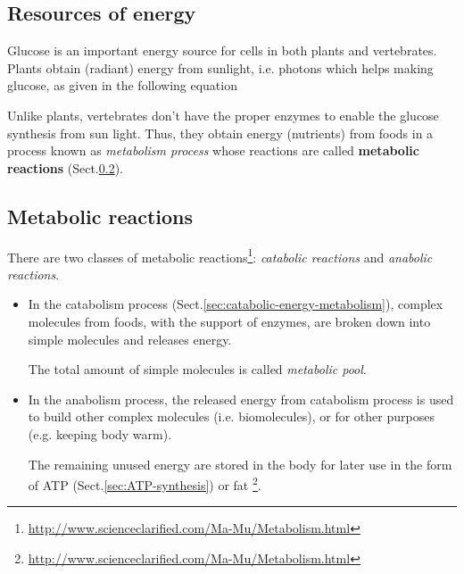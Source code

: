 \subsection{Resources of energy}
\label{sec:resources-energy}

Glucose  is an important energy source for cells in both
plants and vertebrates.
Plants obtain (radiant) energy from sunlight, i.e. photons which helps
making glucose, as given in the following equation

\begin{center}
\end{center}


Unlike plants, vertebrates don't have the proper enzymes to enable
the glucose synthesis from sun light. Thus, they obtain energy
(nutrients) from foods in a process known as {\it metabolism process}
whose reactions are called {\bf metabolic reactions}
(Sect.\ref{sec:metabolic-reactions}).

\subsection{Metabolic reactions}
\label{sec:metabolic-reactions}
\label{sec:anabolic-reaction}

There are two
classes of metabolic reactions\footnote{\url{http://www.scienceclarified.com/Ma-Mu/Metabolism.html}}:
{\it catabolic reactions} and {\it anabolic reactions}.
\begin{itemize}
\item In the catabolism process (Sect.\ref{sec:catabolic-energy-metabolism}),
  complex molecules from foods, with the support of enzymes, are broken down
 into simple molecules and releases energy. 
  
  The total amount of simple molecules is called {\it metabolic pool}.

\item In the anabolism process, the released energy from catabolism
  process is used to build other complex molecules
  (i.e. biomolecules), or for other purposes 
(e.g. keeping body warm). 

The remaining unused energy are stored in the body for later use in the form of
ATP (Sect.\ref{sec:ATP-synthesis}) or fat
\footnote{\url{http://www.scienceclarified.com/Ma-Mu/Metabolism.html}}.

\end{itemize}

